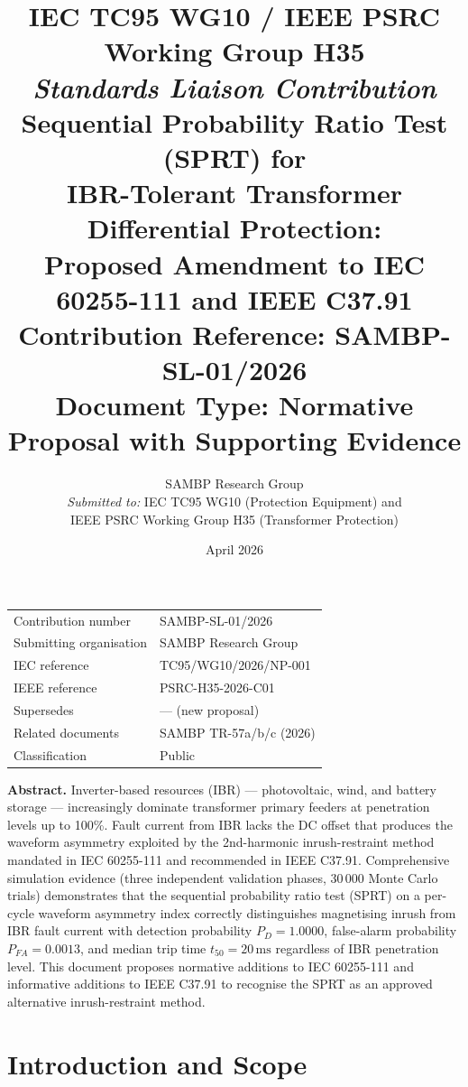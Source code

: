 \documentclass[11pt, a4paper]{article}
\title{%
  \vspace{-10mm}
  \large\textbf{IEC TC95 WG10 / IEEE PSRC Working Group H35}\\[2pt]
  \large\textit{Standards Liaison Contribution}\\[6pt]
  \LARGE\textbf{Sequential Probability Ratio Test (SPRT) for\\
  IBR-Tolerant Transformer Differential Protection:\\
  Proposed Amendment to IEC 60255-111 and IEEE C37.91}\\[6pt]
  \large Contribution Reference: SAMBP-SL-01/2026\\
  \large Document Type: Normative Proposal with Supporting Evidence
}
\author{%
  SAMBP Research Group\\
  \textit{Submitted to:} IEC TC95 WG10 (Protection Equipment) and\\
  IEEE PSRC Working Group H35 (Transformer Protection)
}
\date{April 2026}
\newcommand{\ms}{\,\text{ms}}
\begin{document}
\maketitle
\thispagestyle{fancy}

\begin{center}
\begin{tabular}{ll}
  \toprule
  Contribution number & SAMBP-SL-01/2026 \\
  Submitting organisation & SAMBP Research Group \\
  IEC reference & TC95/WG10/2026/NP-001 \\
  IEEE reference & PSRC-H35-2026-C01 \\
  Supersedes & — (new proposal) \\
  Related documents & SAMBP TR-57a/b/c (2026) \\
  Classification & Public \\
  \bottomrule
\end{tabular}
\end{center}

\vspace{4mm}
\noindent\textbf{Abstract.}\;
Inverter-based resources (IBR) — photovoltaic, wind, and battery storage —
increasingly dominate transformer primary feeders at penetration levels up to
100\%.  Fault current from IBR lacks the DC offset that produces the waveform
asymmetry exploited by the 2nd-harmonic inrush-restraint method mandated in
IEC 60255-111 and recommended in IEEE C37.91.  Comprehensive simulation
evidence (three independent validation phases, 30\,000 Monte Carlo trials)
demonstrates that the sequential probability ratio test (SPRT) on a per-cycle
waveform asymmetry index correctly distinguishes magnetising inrush from IBR
fault current with detection probability $P_D = 1.0000$, false-alarm
probability $P_{FA} = 0.0013$, and median trip time $t_{50} = 20\ms$
regardless of IBR penetration level.  This document proposes normative
additions to IEC 60255-111 and informative additions to IEEE C37.91
to recognise the SPRT as an approved alternative inrush-restraint method.

\tableofcontents
\newpage

\section{Introduction and Scope}
\end{document}
